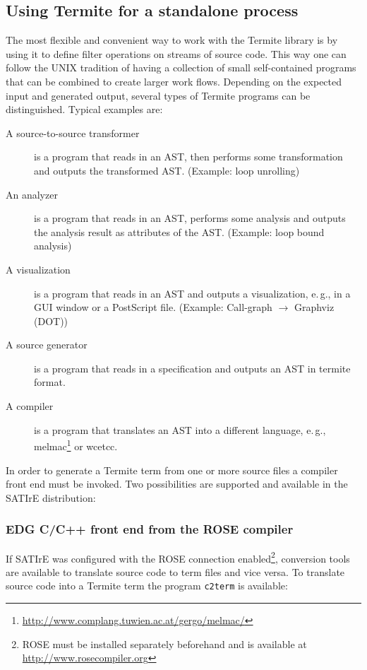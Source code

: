 \documentclass[10pt,twoside]{scrreprt}
\begin{document}
\subsection{Using Termite for a standalone process}
The most flexible and convenient way to work with the Termite library
is by using it to define filter operations on streams of source
code. This way one can follow the UNIX tradition of having a
collection of small self-contained programs that can be combined to
create larger work flows. Depending on the expected input and
generated output, several types of Termite programs can be
distinguished. Typical examples are:
\begin{description}
\item[A source-to-source transformer] is a program that reads in an
  AST, then performs some transformation and outputs the transformed
  AST. (Example: loop unrolling)
\item[An analyzer] is a program that reads in an AST, performs some
  analysis and outputs the analysis result as attributes of the
  AST. (Example: loop bound analysis)
\item[A visualization] is a program that reads in an AST and
  outputs a visualization, e.\,g., in a GUI window or a PostScript
  file. (Example: Call-graph $\rightarrow$ Graphviz (DOT))
\item[A source generator] is a program that reads in a specification
  and outputs an AST in termite format.
\item[A compiler] is a program that translates an AST into a different
  language,                                                     e.\,g.,
  melmac\footnote{\url{http://www.complang.tuwien.ac.at/gergo/melmac/}}
  or wcetcc.
\end{description}
In order to generate a Termite term from one or more source files a
compiler front end must be invoked. Two possibilities are supported
and available in the SATIrE distribution:

\subsubsection{EDG C/C++ front end from the ROSE compiler}
If SATIrE was configured with the ROSE connection
enabled\footnote{ROSE must be installed separately beforehand and is
  available at \url{http://www.rosecompiler.org}}, conversion tools
are available to translate source code to term files and vice versa.
To translate source code into a Termite term the program
\texttt{c2term} is available:
\end{document}
